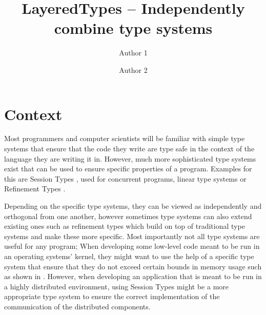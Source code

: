 \documentclass{easychair}
\title{LayeredTypes -- Independently combine type systems}
\author{
Author 1\inst{1}
\and
Author 2\inst{2}
}
\institute{
  Institute 1,
  Location 1\\
  \email{mail1}
\and
   Intitute 2,
   Location 2\\
   \email{mail2}\\
}
\begin{document}
\maketitle





%
%

\section{Context}
\label{sec:context}
Most programmers and computer scientists will be familiar with simple type systems that ensure that the code they write are type safe in the context of the language they are writing it in. However, much more sophisticated type systems exist that can be used to ensure specific properties of a program. Examples for this are Session Types \cite{session}, used for concurrent programs, linear type systems \cite{linear} or Refinement Types \cite{refinement}.

Depending on the specific type systems, they can be viewed as independently and orthogonal from one another, however sometimes type systems can also extend existing ones such as refinement types which build on top of traditional type systems and make these more specific. Most importantly not all type systems are useful for any program; When developing some low-level code meant to be run in an operating systems' kernel, they might want to use the help of a specific type system that ensure that they do not exceed certain bounds in memory usage such as shown in \cite{liquidate-assets}. However, when developing an application that is meant to be run in a highly distributed environment, using Session Types might be a more appropriate type system to ensure the correct implementation of the communication of the distributed components.
\end{document}
